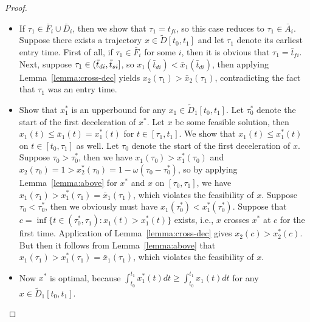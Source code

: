 \documentclass[a4paper]{article}
\theoremstyle{definition}
\theoremstyle{plain}
\begin{document}
\begin{proof}
\begin{itemize}
    \item If $\tau_{1} \in \bar{F}_{i} \cup \bar{D}_{i}$, then we show that
          $\tau_{1} = t_{fi}$, so this case reduces to
          $\tau_{1} \in \bar{A}_{i}$.
          Suppose there exists a trajectory $x \in \widetilde{D}[t_{0}, t_{1}]$
          and let $\tau_{1}$ denote its earliest entry time. First of all, if
          $\tau_{1} \in \bar{F}_{i}$ for some $i$, then it is obvious that
          $\tau_{1} = \bar{t}_{fi}$. Next, suppose
          $\tau_{1} \in (\bar{t}_{di},\bar{t}_{si}]$, so
          $x_{1}(\bar{t}_{di}) < \bar{x}_{1}(\bar{t}_{di})$, then applying
          Lemma~\ref{lemma:cross-dec} yields $x_{2}(\tau_{1}) > \bar{x}_{2}(\tau_{1})$,
          contradicting the fact that $\tau_{1}$ was an entry time.

    \item Show that $x^{*}_{1}$ is an upperbound for any $x_{1} \in \widetilde{D}_{1}[t_{0},t_{1}]$.
          Let $\tau_{0}^{*}$ denote the start of the first deceleration of
          $x^{*}$. Let $x$ be some feasible solution, then
          $x_{1}(t) \leq \bar{x}_{1}(t) = x_{1}^{*}(t)$ for
          $t \in [\tau_{1}, t_{1}]$. We show that $x_{1}(t) \leq x^{*}_{1}(t)$
          on $t \in [t_{0}, \tau_{1}]$ as well. Let $\tau_{0}$ denote the start
          of the first deceleration of $x$.
          Suppose $\tau_{0} > \tau_{0}^{*}$, then we have
          $x_{1}(\tau_{0}) > x^{*}_{1}(\tau_{0})$ and
          $x_{2}(\tau_{0}) = 1 > x_{2}^{*}(\tau_{0}) = 1 - \omega (\tau_{0} - \tau_{0}^{*})$,
          so by applying Lemma~\ref{lemma:above} for $x^{*}$ and $x$ on
          $[\tau_{0}, \tau_{1}]$, we have
          $x_{1}(\tau_{1}) > x^{*}_{1}(\tau_{1}) = \bar{x}_{1}(\tau_{1})$, which
          violates the feasibility of $x$.
          Suppose $\tau_{0} < \tau_{0}^{*}$, then we obviously must have
          $x_{1}(\tau_{0}^{*}) < x_{1}^{*}(\tau_{0}^{*})$. Suppose that
          $c = \inf\{ t \in (\tau_{0}^{*}, \tau_{1}): x_{1}(t) > x_{1}^{*}(t) \}$
          exists, i.e., $x$ crosses $x^{*}$ at $c$ for the first time.
          Application of Lemma~\ref{lemma:cross-dec} gives
          $x_{2}(c) > x^{*}_{2}(c)$. But then it follows from
          Lemma~\ref{lemma:above} that
          $x_{1}(\tau_{1}) > x_{1}^{*}(\tau_{1}) = \bar{x}_{1}(\tau_{1})$, which
          violates the feasibility of $x$.

    \item Now $x^{*}$ is optimal, because
          $\int_{t_{0}}^{t_{1}} x_{1}^{*}(t) dt \geq \int_{t_{0}}^{t_{1}} x_{1}(t) dt$
          for any $x \in \widetilde{D}_{1}[t_{0},t_{1}]$. \qedhere
  \end{itemize}
\end{proof}
\end{document}
